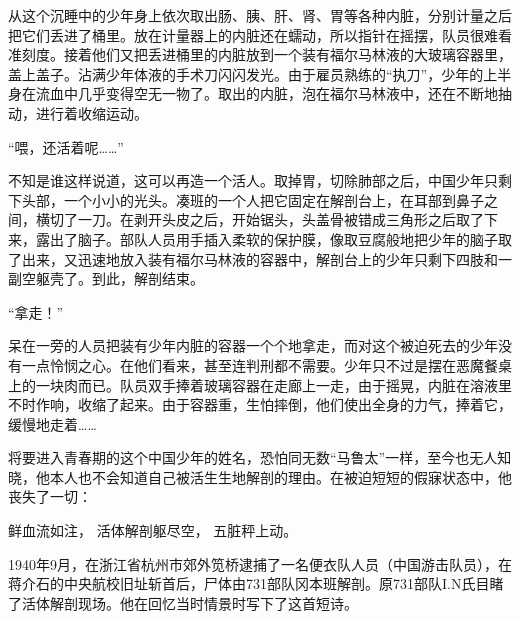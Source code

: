 \documentclass[a4paper,12pt,UTF8,twoside]{ctexbook}
\begin{document}
从这个沉睡中的少年身上依次取出肠、胰、肝、肾、胃等各种内脏，分别计量之后把它们丢进了桶里。放在计量器上的内脏还在蠕动，所以指针在摇摆，队员很难看准刻度。接着他们又把丢进桶里的内脏放到一个装有福尔马林液的大玻璃容器里，盖上盖子。沾满少年体液的手术刀闪闪发光。由于雇员熟练的“执刀”，少年的上半身在流血中几乎变得空无一物了。取出的内脏，泡在福尔马林液中，还在不断地抽动，进行着收缩运动。

“喂，还活着呢……”

不知是谁这样说道，这可以再造一个活人。取掉胃，切除肺部之后，中国少年只剩下头部，一个小小的光头。凑班的一个人把它固定在解剖台上，在耳部到鼻子之间，横切了一刀。在剥开头皮之后，开始锯头，头盖骨被错成三角形之后取了下来，露出了脑子。部队人员用手插入柔软的保护膜，像取豆腐般地把少年的脑子取了出来，又迅速地放入装有福尔马林液的容器中，解剖台上的少年只剩下四肢和一副空躯壳了。到此，解剖结束。

“拿走！”

呆在一旁的人员把装有少年内脏的容器一个个地拿走，而对这个被迫死去的少年没有一点怜悯之心。在他们看来，甚至连判刑都不需要。少年只不过是摆在恶魔餐桌上的一块肉而已。队员双手捧着玻璃容器在走廊上一走，由于摇晃，内脏在溶液里不时作响，收缩了起来。由于容器重，生怕摔倒，他们使出全身的力气，捧着它，缓慢地走着……

将要进入青春期的这个中国少年的姓名，恐怕同无数“马鲁太”一样，至今也无人知晓，他本人也不会知道自己被活生生地解剖的理由。在被迫短短的假寐状态中，他丧失了一切：

鲜血流如注，
活体解剖躯尽空，
五脏秤上动。

1940年9月，在浙江省杭州市郊外笕桥逮捕了一名便衣队人员（中国游击队员），在蒋介石的中央航校旧址斩首后，尸体由731部队冈本班解剖。原731部队I.N氏目睹了活体解剖现场。他在回忆当时情景时写下了这首短诗。



\backmatter
\end{document}
